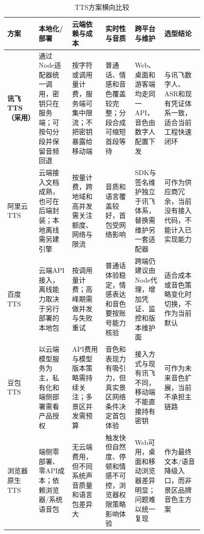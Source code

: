 \begin{landscape}
\begin{table}[H]
  \centering
  \caption{TTS方案横向比较}\label{tab:compare-tts}
  \small
  \renewcommand{\arraystretch}{1.18}
  \begin{tabularx}{\linewidth}{p{0.16\linewidth}p{0.17\linewidth}p{0.17\linewidth}p{0.15\linewidth}p{0.15\linewidth}X}
    \toprule
    方案 & 本地化/部署 & 云端依赖与成本 & 实时性与音质 & 跨平台与维护 & 选型结论 \\
    \midrule
    \textbf{讯飞TTS（采用）} & 通过Node适配器统一调用，密钥只在服务端；可按句分段并保留音频回退 & 按字符或调用量计费，服务端可集中限流；不把密钥暴露给移动端 & 普通话、情感和音色覆盖较完整；分段合成可缩短首段等待 & Web、桌面和游客端均走同一API，音色由数字人配置下发 & 与讯飞数字人、ASR和现有凭证体系一致，适合当前工程快速闭环 \\
    \midrule
    阿里云TTS & 云端接入文档成熟，也可在后端封装；本地离线需另建引擎 & 按量计费，跨地域和高并发需关注额度、网络与限流 & 音质和语言覆盖较好，首包受网络影响 & SDK与签名维护独立于讯飞体系，替换需维护另一套适配器 & 可作为供应商冗余，当前没有接入代码，不能计入已实现能力 \\
    \midrule
    百度TTS & 云端API接入，离线能力取决于另行部署的本地包 & 按调用量计费；高峰期需做并发与失败重试 & 普通话体验稳定，情感表达和音色要按账号能力核验 & 跨端仍建议由Node代理，增加凭证、监控和版本维护面 & 适合成本或音色策略变化时切换，不作为当前默认 \\
    \midrule
    豆包TTS & 以云端模型服务为主，私有化和端侧部署需看产品授权 & API费用与模型版本策略需持续关注；多景区并发需预算 & 音色和表现力有吸引力，但真实景区网络条件决定首包体验 & 接入方式与现有讯飞不同，移动端不能直接持有密钥 & 可作为未来音色扩展，当前不承担主链路 \\
    \midrule
    浏览器原生TTS & 端侧零部署、零API成本；依赖浏览器/系统语音包 & 无云端费用，但不同系统声音质量和语言包差异大 & 触发快但自然度、停顿和情感不可控，浏览器权限策略影响体验 & Web可用，桌面和移动浏览器差异明显；问题难以统一复现 & 作为最终文本/语音降级入口，而非景区品牌音色主方案 \\
    \bottomrule
  \end{tabularx}
\end{table}
\end{landscape}

